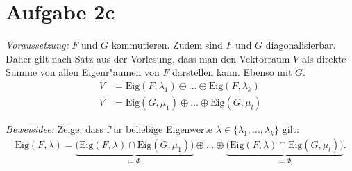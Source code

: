 \documentclass[a4paper,fontsize=12pt]{article}
\theoremstyle{plain}
\begin{document}
\section*{Aufgabe 2c}
\emph{Voraussetzung:} $F$ und $G$ kommutieren. Zudem sind $F$ und $G$ diagonalisierbar. Daher gilt nach Satz aus der Vorlesung, dass man den Vektorraum $V$ als direkte Summe von allen Eigenr"aumen von $F$ darstellen kann. Ebenso mit $G$.
\begin{align*}
    V &= \mathrm{Eig}(F,\lambda_1) \oplus ... \oplus \mathrm{Eig}(F,\lambda_k) \\
    V &= \mathrm{Eig}(G,\mu_1) \oplus ... \oplus \mathrm{Eig}(G,\mu_l)
\end{align*}

\emph{Beweisidee:} Zeige, dass f"ur beliebige Eigenwerte $\lambda \in \{\lambda_1,...,\lambda_k\}$ gilt:
\begin{align}
    \mathrm{Eig}(F,\lambda) = \underbrace{\Big( \mathrm{Eig}(F,\lambda) \cap \mathrm{Eig}(G,\mu_1) \Big)}_{\coloneqq \Phi_1} \oplus ... \oplus \underbrace{\Big( \mathrm{Eig}(F,\lambda) \cap \mathrm{Eig}(G,\mu_l) \Big)}_{\coloneqq \Phi_l}. \label{toto} \tag{$\bigstar$}
\end{align}
\end{document}
